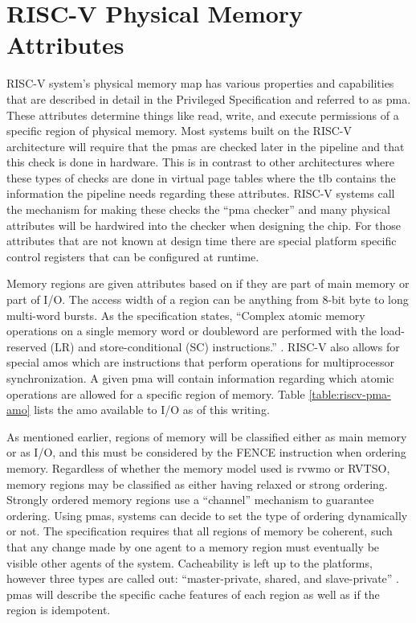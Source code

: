 \section{RISC-V Physical Memory Attributes}
RISC-V system's physical memory map has various properties and capabilities that are described in detail in the Privileged Specification \cite{PrivIsa2019} and referred to as \gls{pma}. These attributes determine things like read, write, and execute permissions of a specific region of physical memory. Most systems built on the RISC-V architecture will require that the \glspl{pma} are checked later in the pipeline and that this check is done in hardware. This is in contrast to other architectures where these types of checks are done in virtual page tables where the \gls{tlb} contains the information the pipeline needs regarding these attributes. RISC-V systems call the mechanism for making these checks the ``\gls{pma} checker'' and many physical attributes will be hardwired into the checker when designing the chip. For those attributes that are not known at design time there are special platform specific control registers that can be configured at runtime.

Memory regions are given attributes based on if they are part of main memory or part of I/O. The access width of a region can be anything from 8-bit byte to long multi-word bursts. As the specification states, ``Complex atomic memory operations on a single memory word or doubleword are performed with the
load-reserved (LR) and store-conditional (SC) instructions.'' \cite{PrivIsa2019}. RISC-V also allows for special \glspl{amo} which are instructions that perform operations for multiprocessor synchronization. A given \gls{pma} will contain information regarding which atomic operations are allowed for a specific region of memory.  Table \ref{table:riscv-pma-amo} lists the \gls{amo} available to I/O as of this writing.

\renewcommand{\arraystretch}{1.5}


As mentioned earlier, regions of memory will be classified either as main memory or as I/O, and this must be considered by the FENCE instruction when ordering memory. Regardless of whether the memory model used is \gls{rvwmo} or RVTSO, memory regions may be classified as either having relaxed or strong ordering. Strongly ordered memory regions use a ``channel'' mechanism to guarantee ordering. Using \glspl{pma}, systems can decide to set the type of ordering dynamically or not. The specification requires that all regions of memory be coherent, such that any change made by one agent to a memory region must eventually be visible other agents of the system. Cacheability is left up to the platforms, however three types are called out: ``master-private, shared, and slave-private'' \cite{PrivIsa2019}. \glspl{pma} will describe the specific cache features of each region as well as if the region is idempotent.

